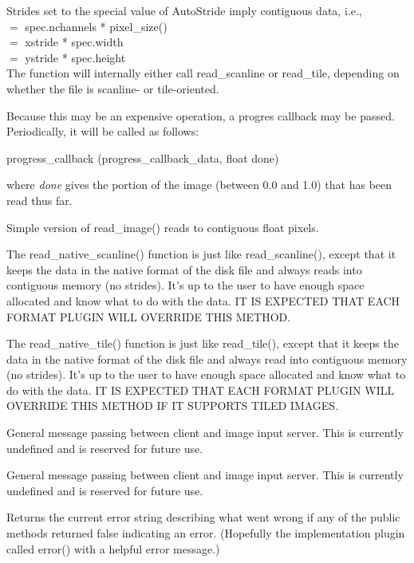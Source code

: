 Strides set to the special value of {\kw AutoStride} imply contiguous
data, i.e., \\
 $=$ {\kw spec.nchannels * pixel_size()} \\
 $=$ {\kw xstride * spec.width} \\
 $=$ {\kw ystride * spec.height} \\
The function will internally either call {\kw read_scanline} or 
{\kw read_tile}, depending on whether the file is scanline- or
tile-oriented.

Because this may be an expensive operation, a progres callback may be passed.
Periodically, it will be called as follows:\\
\begin{code}
    progress_callback (progress_callback_data, float done)
\end{code}
\noindent where \emph{done} gives the portion of the image 
(between 0.0 and 1.0) that has been read thus far.
\apiend

Simple version of {\kw read_image()} reads to contiguous float pixels.
\apiend

The {\kw read_native_scanline()} function is just like {\kw
  read_scanline()}, except that it keeps the data in the native format
of the disk file and always reads into contiguous memory (no strides).
It's up to the user to have enough space allocated and know what to do
with the data.  IT IS EXPECTED THAT EACH FORMAT PLUGIN WILL OVERRIDE
THIS METHOD.
\apiend

The {\kw read_native_tile()} function is just like {\kw read_tile()}, 
except that it keeps the data in the native format of the disk file and
always read into contiguous memory (no strides).  It's up to the user to
have enough space allocated and know what to do with the data.  IT IS
EXPECTED THAT EACH FORMAT PLUGIN WILL OVERRIDE THIS METHOD IF IT
SUPPORTS TILED IMAGES.
\apiend

General message passing between client and image input server.
This is currently undefined and is reserved for future use.
\apiend

General message passing between client and image input server.
This is currently undefined and is reserved for future use.
\apiend

Returns the current error string describing what went wrong if
any of the public methods returned {\kw false} indicating an error.
(Hopefully the implementation plugin called {\kw error()} with a
helpful error message.)
\apiend




\chapwidthend
